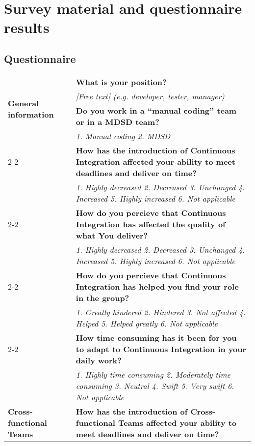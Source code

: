 \documentclass[final_report_innit.tex]{subfiles}
\begin{document}
\section{Survey material and questionnaire results}\label{appendixSurvey}
\subsection{Questionnaire}
\begin{center}
\begin{tabular}[t]{| p{4.5cm} | p{13cm} |}
	\hline
	\multirow{4}{*}{\textbf{General information}} & \cellcolor{greyOdd}\textbf{What is your position?} \\
	& \textit{[Free text] (e.g. developer, tester, manager)} \\ \cline{2-2}
	& \cellcolor{greyOdd}\textbf{Do you work in a ``manual coding'' team or in a MDSD team?} \\
	& \textit{1. Manual coding 2. MDSD} \\ \cline{2-2}
	\hline
	\multirow{16}{*}{\textbf{Continuous Integration}} & \cellcolor{greyOdd}\textbf{How has the introduction of Continuous Integration affected your ability to meet deadlines and deliver on time?} \\ 
	& \textit{1. Highly decreased 2. Decreased 3. Unchanged 4. Increased 5. Highly increased 6. Not applicable} \\ \cline{2-2}
	& \cellcolor{greyOdd}\textbf{How do you percieve that Continuous Integration has affected the quality of what You deliver?} \\
	& \textit{1. Highly decreased 2. Decreased 3. Unchanged 4. Increased 5. Highly increased 6. Not applicable} \\ \cline{2-2}
	& \cellcolor{greyOdd}\textbf{How do you percieve that Continuous Integration has helped you find your role in the group?} \\
	& \textit{1. Greatly hindered 2. Hindered 3. Not affected 4. Helped 5. Helped greatly 6. Not applicable} \\ \cline{2-2}
	& \cellcolor{greyOdd}\textbf{How time consuming has it been for you to adapt to Continuous Integration in your daily work?} \\
	& \textit{1. Highly time consuming 2. Moderately time consuming 3. Neutral 4. Swift 5. Very swift 6. Not applicable} \\
	\hline
	\multirow{16}{*}{\textbf{Cross-functional Teams}} & \cellcolor{greyOdd}\textbf{How has the introduction of Cross-functional Teams affected your ability to meet deadlines and deliver on time?} \\ 

\end{tabular}
\end{center}
\end{document}

